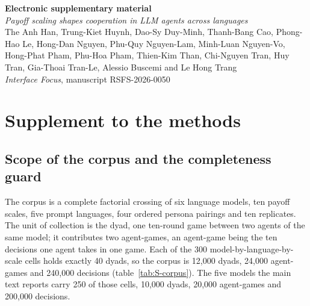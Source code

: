 \documentclass[11pt,a4paper]{article}
\renewcommand{\baselinestretch}{1.15}
\begin{document}
\begin{center}
  {\LARGE\bfseries Electronic supplementary material}\\[6pt]
  {\large\itshape Payoff scaling shapes cooperation in LLM agents across languages}\\[6pt]
  {\small The Anh Han, Trung-Kiet Huynh, Dao-Sy Duy-Minh, Thanh-Bang Cao, Phong-Hao Le,
  Hong-Dan Nguyen, Phu-Quy Nguyen-Lam, Minh-Luan Nguyen-Vo, Hong-Phat Pham, Phu-Hoa Pham,
  Thien-Kim Than, Chi-Nguyen Tran, Huy Tran, Gia-Thoai Tran-Le, Alessio Buscemi and Le Hong Trang}\\[4pt]
  {\small \textit{Interface Focus}, manuscript RSFS-2026-0050}
\end{center}


\appendix


\setcounter{tocdepth}{2}
{\renewcommand{\baselinestretch}{1.0}\selectfont\tableofcontents}  %
\clearpage

\section{Supplement to the methods}\label{appendix:methodology}

\subsection{Scope of the corpus and the completeness guard}\label{appendix:corpus}

The corpus is a complete factorial crossing of six language models, ten payoff scales, five prompt languages, four ordered persona pairings and ten replicates. The unit of collection is the dyad, one ten-round game between two agents of the same model; it contributes two agent-games, an agent-game being the ten decisions one agent takes in one game. Each of the 300 model-by-language-by-scale cells holds exactly 40 dyads, so the corpus is 12{,}000 dyads, 24{,}000 agent-games and 240{,}000 decisions (table~\ref{tab:S-corpus}). The five models the main text reports carry 250 of those cells, 10{,}000 dyads, 20{,}000 agent-games and 200{,}000 decisions.
\end{document}
